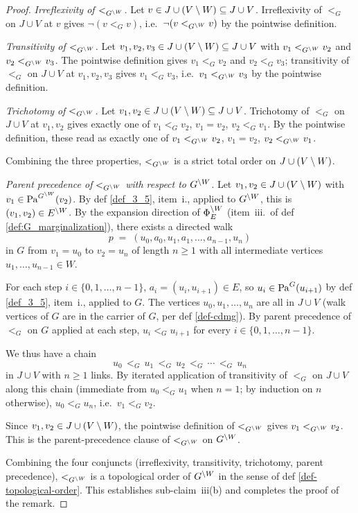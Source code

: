 \documentclass[main]{subfiles}
\begin{document}
\begin{proof}
\emph{Irreflexivity of $<_{G^{\setminus W}}$.}
Let $v \in J \cup (V \setminus W) \subseteq J \cup V$. Irreflexivity of $<_G$ on $J \cup V$ at $v$ gives $\neg (v <_G v)$, i.e.\ $\neg (v <_{G^{\setminus W}} v)$ by the pointwise definition.

\emph{Transitivity of $<_{G^{\setminus W}}$.}
Let $v_1, v_2, v_3 \in J \cup (V \setminus W) \subseteq J \cup V$ with $v_1 <_{G^{\setminus W}} v_2$ and $v_2 <_{G^{\setminus W}} v_3$. The pointwise definition gives $v_1 <_G v_2$ and $v_2 <_G v_3$; transitivity of $<_G$ on $J \cup V$ at $v_1, v_2, v_3$ gives $v_1 <_G v_3$, i.e.\ $v_1 <_{G^{\setminus W}} v_3$ by the pointwise definition.

\emph{Trichotomy of $<_{G^{\setminus W}}$.}
Let $v_1, v_2 \in J \cup (V \setminus W) \subseteq J \cup V$. Trichotomy of $<_G$ on $J \cup V$ at $v_1, v_2$ gives exactly one of $v_1 <_G v_2$, $v_1 = v_2$, $v_2 <_G v_1$. By the pointwise definition, these read as exactly one of $v_1 <_{G^{\setminus W}} v_2$, $v_1 = v_2$, $v_2 <_{G^{\setminus W}} v_1$.

\smallskip
Combining the three properties, $<_{G^{\setminus W}}$ is a strict total order on $J \cup (V \setminus W)$.

\emph{Parent precedence of $<_{G^{\setminus W}}$ with respect to $G^{\setminus W}$.}
Let $v_1, v_2 \in J \cup (V \setminus W)$ with $v_1 \in \mathrm{Pa}^{G^{\setminus W}}(v_2)$. By def \ref{def_3_5}, item~i., applied to $G^{\setminus W}$, this is $(v_1, v_2) \in E^{\setminus W}$. By the expansion direction of $\Phi_E^{\setminus W}$ (item~iii.\ of def \ref{def:G_marginalization}), there exists a directed walk
\[
    p \;=\; (u_0, a_0, u_1, a_1, \dots, a_{n-1}, u_n)
\]
in $G$ from $v_1 = u_0$ to $v_2 = u_n$ of length $n \ge 1$ with all intermediate vertices $u_1, \dots, u_{n-1} \in W$.

For each step $i \in \{0, 1, \dots, n-1\}$, $a_i = (u_i, u_{i+1}) \in E$, so $u_i \in \mathrm{Pa}^G(u_{i+1})$ by def \ref{def_3_5}, item~i., applied to $G$. The vertices $u_0, u_1, \dots, u_n$ are all in $J \cup V$ (walk vertices of $G$ are in the carrier of $G$, per def \ref{def-cdmg}). By parent precedence of $<_G$ on $G$ applied at each step, $u_i <_G u_{i+1}$ for every $i \in \{0, 1, \dots, n-1\}$.

We thus have a chain
\[
    u_0 \,<_G\, u_1 \,<_G\, u_2 \,<_G\, \cdots \,<_G\, u_n
\]
in $J \cup V$ with $n \ge 1$ links. By iterated application of transitivity of $<_G$ on $J \cup V$ along this chain (immediate from $u_0 <_G u_1$ when $n = 1$; by induction on $n$ otherwise), $u_0 <_G u_n$, i.e.\ $v_1 <_G v_2$.

Since $v_1, v_2 \in J \cup (V \setminus W)$, the pointwise definition of $<_{G^{\setminus W}}$ gives $v_1 <_{G^{\setminus W}} v_2$. This is the parent-precedence clause of $<_{G^{\setminus W}}$ on $G^{\setminus W}$.

\smallskip
Combining the four conjuncts (irreflexivity, transitivity, trichotomy, parent precedence), $<_{G^{\setminus W}}$ is a topological order of $G^{\setminus W}$ in the sense of def \ref{def-topological-order}. This establishes sub-claim~iii(b) and completes the proof of the remark.
\end{proof}
\end{document}
